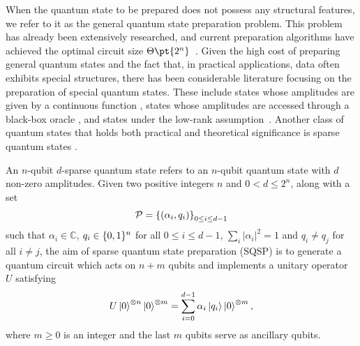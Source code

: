 \documentclass[a4paper,UKenglish,cleveref, autoref, thm-restate]{lipics-v2021}
\DeclarePairedDelimiter\rbra{\lparen}{\rparen}
\DeclarePairedDelimiter\cbra{\{}{\}}
\newcommand{\ta}{\Theta\pt}
\begin{document}
When the quantum state to be prepared does not possess any structural features, we refer to it as the general quantum state preparation problem. This problem has already been extensively researched, and current preparation algorithms have achieved the optimal circuit size $\ta{2^n}$~\cite{grover2002creating,shende2005synthesis,bergholm2005quantum,plesch2011quantum,iten2016quantum}.
Given the high cost of preparing general quantum states and the fact that, in practical applications, data often exhibits special structures, there has been considerable literature focusing on the preparation of special quantum states. These include states whose amplitudes are given by a continuous function \cite{holmes2020efficient, gonzalez2024efficient, rattew2022preparing, marin2023quantum, mcardle2022quantum, moosa2023linear}, states whose amplitudes are accessed through a black-box oracle \cite{sanders2019black, bausch2022fast, wang2021fast}, and states under the low-rank assumption~\cite{araujo2023low}. Another class of quantum states that holds both practical and theoretical significance is sparse quantum states \cite{gleinig2021efficient, malvetti2021quantum, ramacciotti2023simple, mozafari2022efficient, de2020circuit, de2022double, zhang2022quantum, sun2023asymptotically, mao2024towards}. 

An $n$-qubit $d$-sparse quantum state refers to an $n$-qubit quantum state with  $d$ non-zero amplitudes. Given two positive integers $n$ and $0 < d \leq 2^n$, along with a set
\begin{align}
    \mathcal{P} =\cbra*{\rbra{\alpha_i, q_i}}_{0 \leq i \leq d-1}
\end{align}
such that $\alpha_i \in \mathbb{C}$, $q_i \in \cbra{0, 1}^n$ for all $0 \leq i \leq d-1$, $\sum_i |\alpha_i|^2 = 1$ and $q_i \neq q_j$ for all $i \neq j$, the aim of  sparse quantum state preparation (SQSP) is to generate a quantum circuit which acts on $n + m$ qubits and implements a unitary operator $U$ satisfying
\begin{align}
    U \ket{0}^{\otimes n}\ket{0}^{\otimes m} = \sum_{i = 0}^{d-1} \alpha_i \ket{q_i} \ket{0}^{\otimes m},
\end{align}
where $m \geq 0$ is an integer and the last $m$ qubits serve as ancillary qubits.
\end{document}
